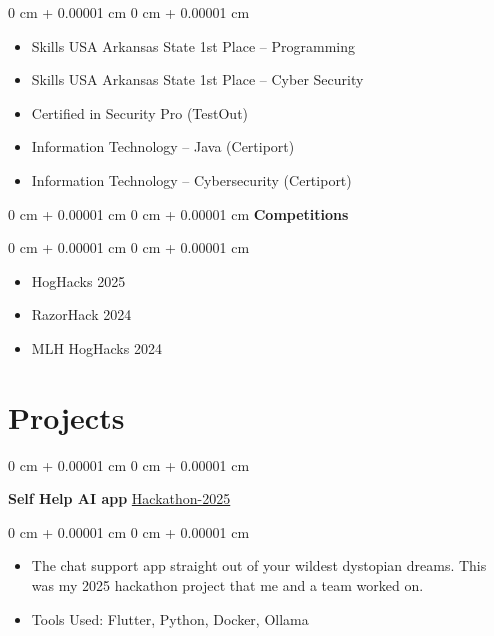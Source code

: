 \documentclass[10pt, letterpaper]{article}
\newenvironment{highlights}{
    \begin{itemize}[
        topsep=0.10 cm,
        parsep=0.10 cm,
        partopsep=0pt,
        itemsep=0pt,
        leftmargin=0 cm + 10pt
    ]
}{
    \end{itemize}
} %
\newenvironment{onecolentry}{
    \begin{adjustwidth}{
        0 cm + 0.00001 cm
    }{
        0 cm + 0.00001 cm
    }
}{
    \end{adjustwidth}
} %
\newenvironment{twocolentry}[2][]{
    \onecolentry
    \def\secondColumn{#2}
    \setcolumnwidth{\fill, 4.5 cm}
    \begin{paracol}{2}
}{
    \switchcolumn \raggedleft \secondColumn
    \end{paracol}
    \endonecolentry
} %
\begin{document}
        \vspace{0.10 cm}
        \begin{onecolentry}
            \begin{highlights}
                \item Skills USA Arkansas State 1st Place – Programming
                \item Skills USA Arkansas State 1st Place – Cyber Security
                \item Certified in Security Pro (TestOut)
                \item Information Technology – Java (Certiport)
                \item Information Technology – Cybersecurity (Certiport)
            \end{highlights}
        \end{onecolentry}
        \vspace{0.10 cm}
       \begin{onecolentry}{
        }
            \textbf{Competitions}\end{onecolentry}
            
        \vspace{0.10 cm}
        \begin{onecolentry}
            \begin{highlights}
                \item HogHacks 2025
                \item RazorHack 2024 
                \item MLH HogHacks 2024
            \end{highlights}
        \end{onecolentry}


    \section{Projects}

        \begin{twocolentry}{
            \href{https://github.com/andrewamidei/Hackathon-2025}{Hackathon-2025}
        }
            \textbf{Self Help AI app}\end{twocolentry}

        \vspace{0.10 cm}
        \begin{onecolentry}
            \begin{highlights}
                \item The chat support app straight out of your wildest dystopian dreams. This was my 2025 hackathon project that me and a team worked on. 
                \item Tools Used: Flutter, Python, Docker, Ollama
            \end{highlights}
        \end{onecolentry}
\end{document}
